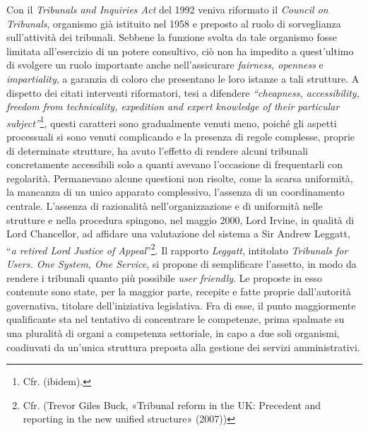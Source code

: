\documentclass[12pt,it,a4paper,]{report}
\begin{document}
Con il \emph{Tribunals and Inquiries Act} del 1992 veniva riformato il
\emph{Council on Tribunals}, organismo già istituito nel 1958 e preposto
al ruolo di sorveglianza sull'attività dei tribunali. Sebbene la
funzione svolta da tale organismo fosse limitata all'esercizio di un
potere consultivo, ciò non ha impedito a quest'ultimo di svolgere un
ruolo importante anche nell'assicurare \emph{fairness, openness} e
\emph{impartiality}, a garanzia di coloro che presentano le loro istanze
a tali strutture. A dispetto dei citati interventi riformatori, tesi a
difendere \emph{``cheapness, accessibility, freedom from technicality,
expedition and expert knowledge of their particular
subject''}\footnote{Cfr. (ibidem).}, questi caratteri sono gradualmente
venuti meno, poiché gli aspetti processuali si sono venuti complicando e
la presenza di regole complesse, proprie di determinate strutture, ha
avuto l'effetto di rendere alcuni tribunali concretamente accessibili
solo a quanti avevano l'occasione di frequentarli con regolarità.
Permanevano alcune questioni non risolte, come la scarsa uniformità, la
mancanza di un unico apparato complessivo, l'assenza di un coordinamento
centrale. L'assenza di razionalità nell'organizzazione e di uniformità
nelle strutture e nella procedura spingono, nel maggio 2000, Lord
Irvine, in qualità di Lord Chancellor, ad affidare una valutazione del
sistema a Sir Andrew Leggatt, ``\emph{a retired Lord Justice of
Appeal}''\footnote{Cfr. (Trevor Giles Buck, {«Tribunal reform in the UK:
  Precedent and reporting in the new unified structure»} (2007))}. Il
rapporto \emph{Leggatt}, intitolato \emph{Tribunals for Users. One
System, One Service}, si propone di semplificare l'assetto, in modo da
rendere i tribunali quanto più possibile \emph{user friendly}. Le
proposte in esso contenute sono state, per la maggior parte, recepite e
fatte proprie dall'autorità governativa, titolare dell'iniziativa
legislativa. Fra di esse, il punto maggiormente qualificante sta nel
tentativo di concentrare le competenze, prima spalmate su una pluralità
di organi a competenza settoriale, in capo a due soli organismi,
coadiuvati da un'unica struttura preposta alla gestione dei servizi
amministrativi.
\end{document}
